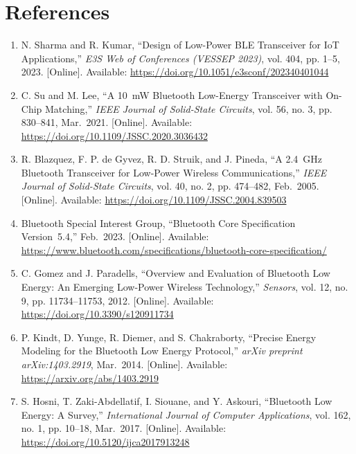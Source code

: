 \documentclass[12pt,singleside,a4paper]{report}
\begin{document}
\chapter*{References}

\begin{small}
\sloppy
\begin{enumerate}

\item N. Sharma and R. Kumar, “Design of Low-Power BLE Transceiver for IoT Applications,” \textit{E3S Web of Conferences (VESSEP 2023)}, vol. 404, pp. 1--5, 2023. [Online]. Available: \url{https://doi.org/10.1051/e3sconf/202340401044}

\item C. Su and M. Lee, “A 10~mW Bluetooth Low-Energy Transceiver with On-Chip Matching,” \textit{IEEE Journal of Solid-State Circuits}, vol. 56, no. 3, pp. 830--841, Mar.~2021. [Online]. Available: \url{https://doi.org/10.1109/JSSC.2020.3036432}

\item R. Blazquez, F. P. de Gyvez, R. D. Struik, and J. Pineda, “A 2.4~GHz Bluetooth Transceiver for Low-Power Wireless Communications,” \textit{IEEE Journal of Solid-State Circuits}, vol. 40, no. 2, pp. 474--482, Feb.~2005. [Online]. Available: \url{https://doi.org/10.1109/JSSC.2004.839503}

\item Bluetooth Special Interest Group, “Bluetooth Core Specification Version~5.4,” Feb.~2023. [Online]. Available: \url{https://www.bluetooth.com/specifications/bluetooth-core-specification/}

\item C. Gomez and J. Paradells, “Overview and Evaluation of Bluetooth Low Energy: An Emerging Low-Power Wireless Technology,” \textit{Sensors}, vol. 12, no. 9, pp. 11734--11753, 2012. [Online]. Available: \url{https://doi.org/10.3390/s120911734}

\item P. Kindt, D. Yunge, R. Diemer, and S. Chakraborty, “Precise Energy Modeling for the Bluetooth Low Energy Protocol,” \textit{arXiv preprint arXiv:1403.2919}, Mar.~2014. [Online]. Available: \url{https://arxiv.org/abs/1403.2919}

\item S. Hosni, T. Zaki-Abdellatif, I. Siouane, and Y. Askouri, “Bluetooth Low Energy: A Survey,” \textit{International Journal of Computer Applications}, vol. 162, no. 1, pp. 10--18, Mar.~2017. [Online]. Available: \url{https://doi.org/10.5120/ijca2017913248}


\end{enumerate}
\end{small}
\end{document}
